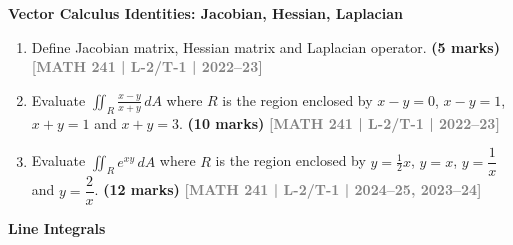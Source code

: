 \documentclass[12pt,a4paper]{article}
\newcommand{\yr}[1]{\hfill\textcolor{gray}{\small\textbf{[#1]}}}
\newcommand{\mk}[1]{\textcolor{orange!70!black}{\small\textbf{(#1 marks)}}}
\newcommand{\subtopic}[2]{%
  \vspace{10pt}
  \noindent\begin{tcolorbox}[colback=#1!8,colframe=#1,boxrule=0.6pt,arc=4pt,
    left=6pt,right=6pt,top=4pt,bottom=4pt]
    \small\bfseries\textcolor{#1}{#2}
  \end{tcolorbox}
  \vspace{2pt}
}
\begin{document}
\subtopic{cD}{Vector Calculus Identities: Jacobian, Hessian, Laplacian}
\label{sub:s4-identities}

\begin{enumerate}

\item Define Jacobian matrix, Hessian matrix and Laplacian operator.
\mk{5} \yr{MATH 241 | L-2/T-1 | 2022--23}

\item Evaluate $\displaystyle\iint_{R}\frac{x-y}{x+y}\,dA$ where $R$ is the region enclosed by $x-y=0$, $x-y=1$, $x+y=1$ and $x+y=3$.
\mk{10} \yr{MATH 241 | L-2/T-1 | 2022--23}


\item Evaluate $\displaystyle\iint_{R}e^{xy}\,dA$ where $R$ is the region enclosed by $y=\tfrac{1}{2}x$, $y=x$, $y=\dfrac{1}{x}$ and $y=\dfrac{2}{x}$.
\mk{12} \yr{MATH 241 | L-2/T-1 | 2024--25, 2023--24}

\end{enumerate}

\subtopic{cD}{Line Integrals}
\label{sub:s4-lineint}
\end{document}
